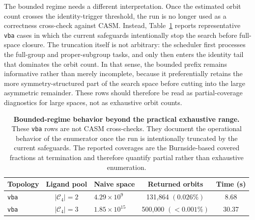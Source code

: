 \documentclass[pdflatex,sn-mathphys-num]{sn-jnl}
\theoremstyle{thmstyleone}%
\begin{document}
The bounded regime needs a different interpretation. Once the estimated orbit count crosses the identity-trigger threshold, the run is no longer used as a correctness cross-check against CASM. Instead, Table~\ref{tab:bounded} reports representative \texttt{vba} cases in which the current safeguards intentionally stop the search before full-space closure. The truncation itself is not arbitrary: the scheduler first processes the full-group and proper-subgroup tasks, and only then enters the identity tail that dominates the orbit count. In that sense, the bounded prefix remains informative rather than merely incomplete, because it preferentially retains the more symmetry-structured part of the search space before cutting into the large asymmetric remainder. These rows should therefore be read as partial-coverage diagnostics for large spaces, not as exhaustive orbit counts.

\begin{table}[htbp]
\centering
\small
\caption{\textbf{Bounded-regime behavior beyond the practical exhaustive range.} These \texttt{vba} rows are not CASM cross-checks. They document the operational behavior of the enumerator once the run is intentionally truncated by the current safeguards. The reported coverages are the Burnside-based covered fractions at termination and therefore quantify partial rather than exhaustive enumeration.}
\label{tab:bounded}
\setlength{\tabcolsep}{2.6mm}
\renewcommand{\arraystretch}{1.2}
\begin{tabular}{lclcc}
\toprule
\textbf{Topology} & \textbf{Ligand pool} & \textbf{Naive space} & \textbf{Returned orbits} & \textbf{Time (s)} \\
\midrule
\texttt{vba} & $|\mathcal{C}_4|{=}2$ & $4.29\times10^{9}$  & 131{,}864 $(0.026\%)$    & 8.68 \\
\texttt{vba} & $|\mathcal{C}_4|{=}3$ & $1.85\times10^{15}$ & 500{,}000 $(<0.001\%)$ & 30.37 \\
\bottomrule
\end{tabular}
\end{table}
\end{document}
